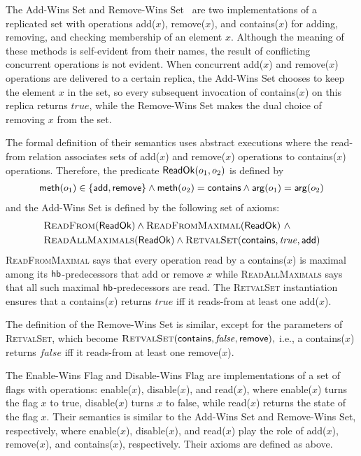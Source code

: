 The Add-Wins Set and Remove-Wins Set~\cite{DBLP:journals/eatcs/ShapiroPBZ11}
are two implementations of a replicated set with operations {\sf add}($x$), {\sf remove}($x$), and {\sf contains}($x$) for adding, removing, and checking membership of an element $x$.
Although the meaning of these methods is self-evident from their names,
 the result of conflicting concurrent operations is not evident. When concurrent {\sf add}($x$) and {\sf remove}($x$)
 operations are delivered to a certain replica, the Add-Wins Set chooses to keep the element $x$ in the set, so every
 subsequent invocation of {\sf contains}($x$) on this replica returns $\mathit{true}$, while the Remove-Wins Set makes the dual choice
 of removing $x$ from the set.

The formal definition of their semantics uses abstract executions where the read-from relation associates sets of {\sf add}($x$) and {\sf remove}($x$)
operations to {\sf contains}($x$) operations. Therefore, the predicate ${\sf ReadOk}(o_1,o_2)$ is defined by
\begin{align*}
{\sf meth}(o_1) \in \{{\sf add},{\sf remove}\} \land {\sf meth}(o_2) ={\sf contains} \land {\sf arg}(o_1)= {\sf arg}(o_2)
\end{align*}
and the Add-Wins Set is defined by the following set of axioms:
\begin{align*}
&\textsc{ReadFrom}({\sf ReadOk}) \land \textsc{ReadFromMaximal}({\sf ReadOk})\ \land \\
& \textsc{ReadAllMaximals}({\sf ReadOk}) \land \textsc{RetvalSet}({\sf contains},\mathit{true},{\sf add})
\end{align*}
\textsc{ReadFromMaximal} says that every operation read by a {\sf contains}($x$) is maximal among its $\textsf{hb}$-predecessors that add or remove $x$ while \textsc{ReadAllMaximals} says that all such maximal $\textsf{hb}$-predecessors are read. The \textsc{RetvalSet} instantiation ensures that a {\sf contains}($x$) returns $\mathit{true}$ iff it reads-from at least one {\sf add}($x$).

The definition of the Remove-Wins Set is similar, except for the parameters of \textsc{RetvalSet}, which become
$
\textsc{RetvalSet}({\sf contains},\mathit{false},{\sf remove}),
$
i.e., a {\sf contains}($x$) returns $\mathit{false}$ iff it reads-from at least one {\sf remove}($x$).

The Enable-Wins Flag and Disable-Wins Flag are implementations of a set of flags with operations: {\sf enable}($x$), {\sf disable}($x$), and {\sf read}($x$), where {\sf enable}($x$) turns the flag $x$ to true, {\sf disable}($x$) turns $x$ to false, while {\sf read}($x$) returns the state of the flag $x$. Their semantics is similar to the Add-Wins Set and Remove-Wins Set, respectively, where {\sf enable}($x$), {\sf disable}($x$), and {\sf read}($x$) play the role of {\sf add}($x$), {\sf remove}($x$), and {\sf contains}($x$), respectively. Their axioms are defined as above.


